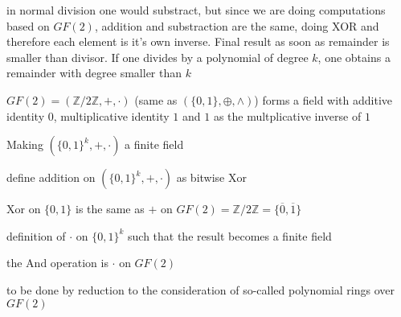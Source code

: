 \documentclass[landscape, a4paper]{article}
\begin{document}
\begin{minipage}[t]{0.2\linewidth}
\begin{betterlist}
\begin{betterlist}
		\end{betterlist}
	\end{betterlist}
	\begin{betterlist}
		\item in normal division one would substract, but since we are doing computations based on $GF(2)$, addition and substraction are the same, doing XOR and therefore each element is it's own inverse. Final result as soon as remainder is smaller than divisor. If one divides by a polynomial of degree $k$, one obtains a remainder with degree smaller than $k$
	\end{betterlist}
	\begin{betterlist}
		\item $GF(2) = (\mathbb{Z}/2\mathbb{Z}, +, \cdot)$ (same as $(\{0, 1\}, \oplus, \land)$) forms a field with additive identity $0$, multiplicative identity $1$ and $1$ as the multplicative inverse of $1$
		\item Making $(\{0, 1\}^k, +, \cdot)$ a finite field
		\begin{betterlist}
			\item define addition on $(\{0,1\}^k, +, \cdot)$ as bitwise Xor
			\begin{betterlist}
				\item Xor on $\{0,1\}$ is the same as $+$ on $GF(2) = \mathbb{Z}/2\mathbb{Z} = \{\overline{0}, \overline{1}\}$
			\end{betterlist}
			\item definition of $\cdot$ on $\{0,1\}^k$ such that the result becomes a finite field
			\begin{betterlist}
				\item the And operation is $\cdot$ on $GF(2)$
				\item to be done by reduction to the consideration of so-called polynomial rings over $GF(2)$
			\end{betterlist}

\end{betterlist}
\end{betterlist}
\end{minipage}
\end{document}

